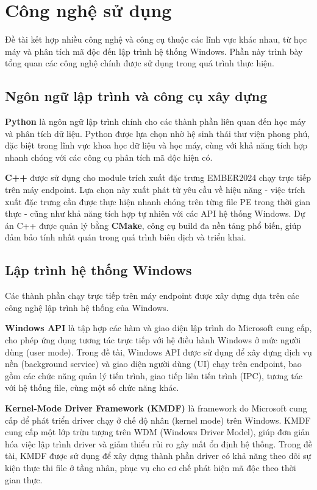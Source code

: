 \section{Công nghệ sử dụng}

Đề tài kết hợp nhiều công nghệ và công cụ thuộc các lĩnh vực khác
nhau, từ học máy và phân tích mã độc đến lập trình hệ thống Windows.
Phần này trình bày tổng quan các công nghệ chính được sử dụng trong
quá trình thực hiện.

\subsection{Ngôn ngữ lập trình và công cụ xây dựng}

\textbf{Python} là ngôn ngữ lập trình chính cho các thành phần liên
quan đến học máy và phân tích dữ liệu. Python được lựa chọn nhờ hệ
sinh thái thư viện phong phú, đặc biệt trong lĩnh vực khoa học dữ
liệu và học máy, cùng với khả năng tích hợp nhanh chóng với các công
cụ phân tích mã độc hiện có.

\textbf{C++} được sử dụng cho module trích xuất đặc trưng EMBER2024
chạy trực tiếp trên máy endpoint. Lựa chọn này xuất phát từ yêu cầu
về hiệu năng - việc trích xuất đặc trưng cần được thực hiện nhanh
chóng trên từng file PE trong thời gian thực - cũng như khả năng
tích hợp tự nhiên với các API hệ thống Windows. Dự án C++ được quản
lý bằng \textbf{CMake}, công cụ build đa nền tảng phổ biến, giúp đảm
bảo tính nhất quán trong quá trình biên dịch và triển khai.

\subsection{Lập trình hệ thống Windows}

Các thành phần chạy trực tiếp trên máy endpoint được xây dựng dựa
trên các công nghệ lập trình hệ thống của Windows.

\textbf{Windows API} \cite{winapi} là tập hợp các hàm và giao diện
lập trình do Microsoft cung cấp, cho phép ứng dụng tương tác trực
tiếp với hệ điều hành Windows ở mức người dùng (user mode). Trong đề
tài, Windows API được sử dụng để xây dựng dịch vụ nền (background
service) và giao diện người dùng (UI) chạy trên endpoint, bao gồm
các chức năng quản lý tiến trình, giao tiếp liên tiến trình (IPC),
tương tác với hệ thống file, cùng một số chức năng khác.

\textbf{Kernel-Mode Driver Framework (KMDF)} \cite{kmdf} là framework
do Microsoft cung cấp để phát triển driver chạy ở chế độ nhân
(kernel mode) trên Windows. KMDF cung cấp một lớp trừu tượng trên
WDM (Windows Driver Model), giúp đơn giản hóa việc lập trình driver
và giảm thiểu rủi ro gây mất ổn định hệ thống. Trong đề tài, KMDF
được sử dụng để xây dựng thành phần driver có khả năng theo dõi sự
kiện thực thi file ở tầng nhân, phục vụ cho cơ chế phát hiện mã độc
theo thời gian thực.

